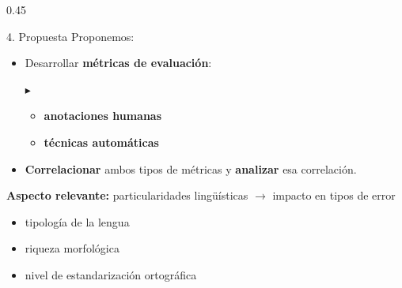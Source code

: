 \documentclass[final]{beamer}
\begin{document}
\begin{frame}[t]
\begin{columns}[t,onlytextwidth]
\begin{column}{0.45\textwidth}
  \begin{pblock}{4. Propuesta}
  Proponemos:
    \begin{itemize}
      \item Desarrollar \textbf{métricas de evaluación}:
      {
      {\color{tudBlue}$\blacktriangleright$}
      \begin{itemize}
        \item \textbf{anotaciones humanas}
        \item \textbf{técnicas automáticas}
      \end{itemize}
      }
      \item \textbf{Correlacionar} ambos tipos de métricas y \textbf{analizar} esa correlación.
      \end{itemize}
      \textbf{Aspecto relevante:} particularidades lingüísticas $\rightarrow$ impacto en tipos de error
      {
      \begin{itemize}
        \item tipología de la lengua
        \item riqueza morfológica
        \item nivel de estandarización ortográfica
      \end{itemize}
      }
  \end{pblock}


\end{column}
\end{columns}
\end{frame}
\end{document}
